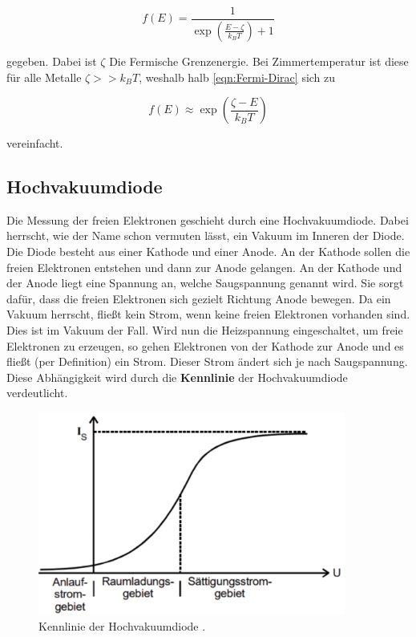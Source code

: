 \begin{equation}
    f(E)=\frac{1}{\exp{\left(\frac{E-\zeta}{k_B T}\right)} + 1}
    \label{eqn:Fermi-Dirac}
\end{equation}

\noindent gegeben. Dabei ist $\zeta$ Die Fermische Grenzenergie. Bei Zimmertemperatur ist diese für alle Metalle 
$\zeta >>k_B T$, weshalb halb \autoref{eqn:Fermi-Dirac} sich zu 

\begin{equation*}
    f(E) \approx \exp{\left(\frac{\zeta - E}{k_B T}\right)}
\end{equation*}

\noindent vereinfacht.


\subsection{Hochvakuumdiode}
Die Messung der freien Elektronen geschieht durch eine Hochvakuumdiode. Dabei herrscht, wie der Name schon vermuten 
lässt, ein Vakuum im Inneren der Diode. Die Diode besteht aus einer Kathode und einer Anode. An der Kathode sollen 
die freien Elektronen entstehen und dann zur Anode gelangen. An der Kathode und der Anode liegt eine Spannung an, 
welche Saugspannung genannt wird. Sie sorgt dafür, dass die freien Elektronen sich gezielt Richtung Anode bewegen. 
Da ein Vakuum herrscht, fließt kein Strom, wenn keine freien Elektronen vorhanden sind. Dies ist im Vakuum der Fall. 
Wird nun die Heizspannung eingeschaltet, um freie Elektronen zu erzeugen, so gehen Elektronen von der Kathode zur 
Anode und es fließt (per Definition) ein Strom. Dieser Strom ändert sich je nach Saugspannung. Diese Abhängigkeit 
wird durch die \textbf{Kennlinie} der Hochvakuumdiode verdeutlicht. 

\begin{figure}
    \centering
    \includegraphics[width=0.9\textwidth]{Kennlinie.png}
    \caption{Kennlinie der Hochvakuumdiode \cite{Versuchsanleitung_v504}.}
\end{figure}

